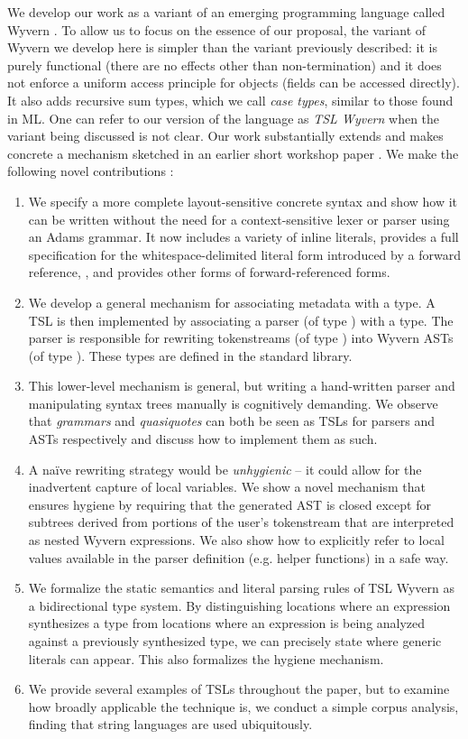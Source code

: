 We develop our work as a variant of an emerging programming language called Wyvern \cite{Nistor:2013:WST:2489828.2489830}. To allow us to focus on the essence of our proposal, the variant of Wyvern we develop here is simpler than the variant previously described: it is purely functional (there are no effects other than non-termination) and it does not enforce a uniform access principle for objects (fields can be accessed directly). It also adds recursive sum types, which we call \emph{case types}, similar to those found in ML. One can refer to our version of the language as \emph{TSL Wyvern} when the variant being discussed is not clear. Our work substantially extends and makes concrete a mechanism sketched in an earlier short workshop paper \cite{Omar:2013:TWP:2489812.2489815}. We make the following novel contributions :
\begin{enumerate}
\item We specify a more complete layout-sensitive concrete syntax and show how it can be written without the need for a context-sensitive lexer or parser using an Adams grammar. It now includes a variety of inline literals, provides a full specification for the whitespace-delimited literal form introduced by a forward reference, \li{~}, and provides other forms of forward-referenced forms.
\item We develop a general mechanism for associating metadata with a type. A TSL is then implemented by associating a parser (of type ) with a type. The parser is responsible for rewriting tokenstreams (of type ) into Wyvern ASTs (of type ). These types are defined in the standard library.
\item This lower-level mechanism is general, but writing a hand-written parser and manipulating syntax trees manually is cognitively demanding. We observe that \emph{grammars} and \emph{quasiquotes} can both be seen as TSLs for parsers and ASTs respectively and discuss how to implement them as such.
\item A na\"ive rewriting strategy would be \emph{unhygienic} -- it could allow for the inadvertent capture of local variables. We show a novel mechanism that ensures hygiene by requiring that the generated AST is closed except for subtrees derived from portions of the user's tokenstream that are interpreted as nested Wyvern expressions. We also show how to explicitly refer to local values available in the parser definition (e.g. helper functions) in a safe way. 
\item We formalize the static semantics and literal parsing rules of TSL Wyvern as a bidirectional type system. By distinguishing locations where an expression synthesizes a type from locations where an expression is being analyzed against a previously synthesized type, we can precisely state where generic literals can appear. This also formalizes the hygiene mechanism.
\item We provide several examples of TSLs throughout the paper, but to examine how broadly applicable the technique is, we conduct a simple corpus analysis, finding that string languages are used ubiquitously.
\end{enumerate}
